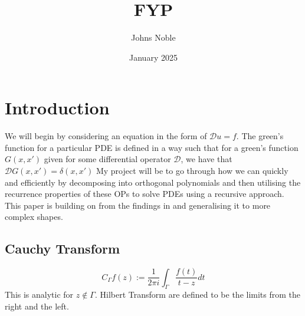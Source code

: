 \documentclass{article}
\title{FYP}
\author{Johns Noble}
\date{January 2025}
\begin{document}
\maketitle

\newpage
\tableofcontents
\newpage

\section{Introduction}
We will begin by considering an equation in the form of $\mathcal{D}u=f$.
The green's function for a particular PDE is defined in a way such that for a green's function $G(x,x')$ given for some differential operator $\mathcal{D}$, we have that $\mathcal{D}G(x,x') = \delta(x,x')$
My project will be to go through how we can quickly and efficiently by decomposing into orthogonal polynomials and then utilising the recurrence properties of these OPs to solve PDEs using a recursive approach.
This paper is building on from the findings in\cite{logkernel} and generalising it to more complex shapes.
\subsection{Cauchy Transform}
\begin{equation} \label{cauchy transform}
C_\Gamma f(z):=\frac{1}{2\pi i}\int_\Gamma \frac{f(t)}{t-z}dt
\end{equation}
This is analytic for $z \not\in \Gamma$. Hilbert Transform are defined to be the limits from the right and the left.
\end{document}
